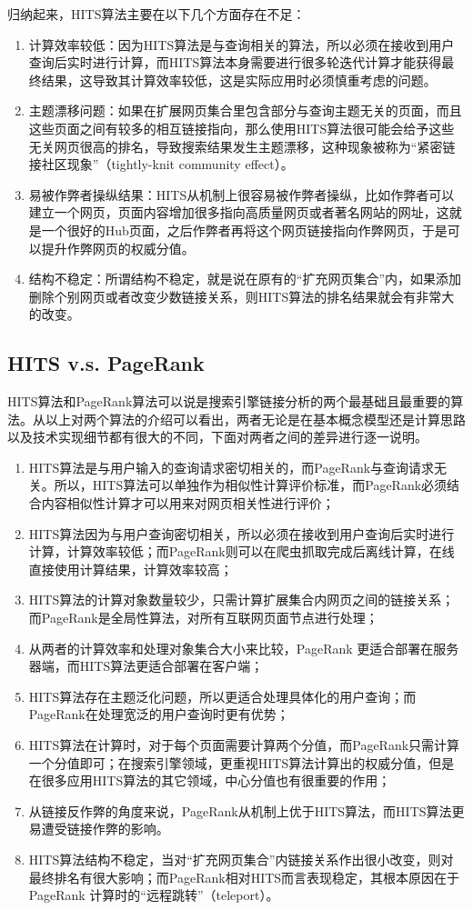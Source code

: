归纳起来，HITS算法主要在以下几个方面存在不足：
\begin{enumerate}
  \item 计算效率较低：因为HITS算法是与查询相关的算法，所以必须在接收到用户查询后实时进行计算，而HITS算法本身需要进行很多轮迭代计算才能获得最终结果，这导致其计算效率较低，这是实际应用时必须慎重考虑的问题。
  \item 主题漂移问题：如果在扩展网页集合里包含部分与查询主题无关的页面，而且这些页面之间有较多的相互链接指向，那么使用HITS算法很可能会给予这些无关网页很高的排名，导致搜索结果发生主题漂移，这种现象被称为“紧密链接社区现象”（tightly-knit community effect）。
  \item 易被作弊者操纵结果：HITS从机制上很容易被作弊者操纵，比如作弊者可以建立一个网页，页面内容增加很多指向高质量网页或者著名网站的网址，这就是一个很好的Hub页面，之后作弊者再将这个网页链接指向作弊网页，于是可以提升作弊网页的权威分值。
  \item 结构不稳定：所谓结构不稳定，就是说在原有的“扩充网页集合”内，如果添加删除个别网页或者改变少数链接关系，则HITS算法的排名结果就会有非常大的改变。
\end{enumerate}

\subsection{HITS v.s. PageRank}
HITS算法和PageRank算法可以说是搜索引擎链接分析的两个最基础且最重要的算法。从以上对两个算法的介绍可以看出，两者无论是在基本概念模型还是计算思路以及技术实现细节都有很大的不同，下面对两者之间的差异进行逐一说明。

\begin{enumerate}
  \item HITS算法是与用户输入的查询请求密切相关的，而PageRank与查询请求无关。所以，HITS算法可以单独作为相似性计算评价标准，而PageRank必须结合内容相似性计算才可以用来对网页相关性进行评价；
  \item HITS算法因为与用户查询密切相关，所以必须在接收到用户查询后实时进行计算，计算效率较低；而PageRank则可以在爬虫抓取完成后离线计算，在线直接使用计算结果，计算效率较高；
  \item HITS算法的计算对象数量较少，只需计算扩展集合内网页之间的链接关系；而PageRank是全局性算法，对所有互联网页面节点进行处理；
  \item 从两者的计算效率和处理对象集合大小来比较，PageRank 更适合部署在服务器端，而HITS算法更适合部署在客户端；
  \item HITS算法存在主题泛化问题，所以更适合处理具体化的用户查询；而PageRank在处理宽泛的用户查询时更有优势；
  \item HITS算法在计算时，对于每个页面需要计算两个分值，而PageRank只需计算一个分值即可；在搜索引擎领域，更重视HITS算法计算出的权威分值，但是在很多应用HITS算法的其它领域，中心分值也有很重要的作用；
  \item 从链接反作弊的角度来说，PageRank从机制上优于HITS算法，而HITS算法更易遭受链接作弊的影响。
  \item HITS算法结构不稳定，当对“扩充网页集合”内链接关系作出很小改变，则对最终排名有很大影响；而PageRank相对HITS而言表现稳定，其根本原因在于PageRank 计算时的“远程跳转”（teleport）。
\end{enumerate}

